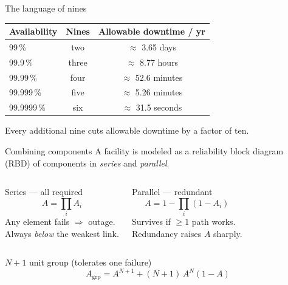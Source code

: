 \begin{frame}{The language of nines}
  \centering
  \renewcommand{\arraystretch}{1.25}
  \begin{tabular}{lcc}
    \toprule
    \textbf{Availability} & \textbf{Nines} & \textbf{Allowable downtime / yr} \\
    \midrule
    99\,\%      & two   & $\approx$ 3.65 days   \\
    99.9\,\%    & three & $\approx$ 8.77 hours  \\
    99.99\,\%   & four  & $\approx$ 52.6 minutes\\
    99.999\,\%  & five  & $\approx$ 5.26 minutes\\
    99.9999\,\% & six   & $\approx$ 31.5 seconds\\
    \bottomrule
  \end{tabular}

  \vspace{1em}
  \small Every additional nine cuts allowable downtime by a factor of ten.
\end{frame}

\begin{frame}{Combining components}
  A facility is modeled as a reliability block diagram (RBD) of components in
  \emph{series} and \emph{parallel}.

  \vspace{0.4em}
  \begin{columns}[T]
      \begin{block}{Series --- all required}
        \[ A = \prod_i A_i \]
        Any element fails $\Rightarrow$ outage.\\
        Always \emph{below} the weakest link.
      \end{block}
      \begin{block}{Parallel --- redundant}
        \[ A = 1 - \prod_i (1-A_i) \]
        Survives if $\geq 1$ path works.\\
        Redundancy raises $A$ sharply.
      \end{block}
  \end{columns}

  \vspace{0.5em}
  \begin{alertblock}{$N{+}1$ unit group (tolerates one failure)}
    \[ A_{\text{grp}} = A^{N+1} + (N{+}1)\,A^{N}(1-A) \]
  \end{alertblock}
\end{frame}

